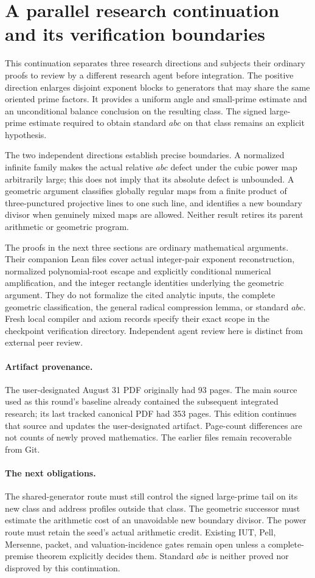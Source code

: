 \section{A parallel research continuation and its verification boundaries}
\label{sec:research-group-20260907}
This continuation separates three research directions and subjects their ordinary
proofs to review by a different research agent before integration. The positive
direction enlarges disjoint exponent blocks to generators that may share the
same oriented prime factors. It provides a uniform angle and small-prime estimate
and an unconditional balance conclusion on the resulting class. The signed
large-prime estimate required to obtain standard $abc$ on that class remains an
explicit hypothesis.

The two independent directions establish precise boundaries. A normalized
infinite family makes the actual relative $abc$ defect under the cubic power
map arbitrarily large; this does not imply that its absolute defect is
unbounded. A geometric argument classifies globally regular maps from a finite
product of three-punctured projective lines to one such line, and identifies a
new boundary divisor when genuinely mixed maps are allowed. Neither result
retires its parent arithmetic or geometric program.

The proofs in the next three sections are ordinary mathematical arguments.
Their companion Lean files cover actual integer-pair exponent reconstruction,
normalized polynomial-root escape and explicitly conditional numerical
amplification, and the integer rectangle identities underlying the geometric
argument. They do not formalize the cited analytic inputs, the complete
geometric classification, the general radical compression lemma, or standard
$abc$. Fresh local compiler and axiom records specify their exact scope in the
checkpoint verification directory. Independent agent review here is distinct
from external peer review.

\paragraph{Artifact provenance.}
The user-designated August 31 PDF originally had 93 pages. The main source used
as this round's baseline already contained the subsequent integrated research;
its last tracked canonical PDF had 353 pages. This edition continues that source
and updates the user-designated artifact. Page-count differences are not counts
of newly proved mathematics. The earlier files remain recoverable from Git.

\paragraph{The next obligations.}
The shared-generator route must still control the signed large-prime tail on
its new class and address profiles outside that class. The geometric successor
must estimate the arithmetic cost of an unavoidable new boundary divisor.
The power route must retain the seed's actual arithmetic credit. Existing
IUT, Pell, Mersenne, packet, and valuation-incidence gates remain open unless a
complete-premise theorem explicitly decides them. Standard $abc$ is neither
proved nor disproved by this continuation.
